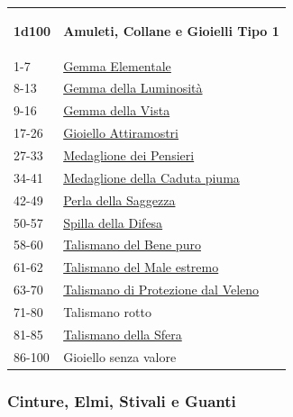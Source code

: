 \begin{multicols}{2}
{\medskip

{\small\begin{tabularx}{0.45\textwidth}{lX}\hypertarget{amuleticollanegioielli2}{}
\textbf{1d100} & \textbf{Amuleti, Collane e Gioielli Tipo 1}\\
1-7 & \hyperlink{GemmaElementale}{Gemma Elementale}\\
8-13& \hyperlink{GemmadellaLuminosità}{Gemma della Luminosità}\\
9-16& \hyperlink{GemmadellaVista}{Gemma della Vista}\\
17-26& \hyperlink{GioielloAttiramostri}{Gioiello Attiramostri}\\
27-33& \hyperlink{MedaglionedeiPensieri}{Medaglione dei Pensieri}\\
34-41& \hyperlink{MedaglionedellaCadutapiuma}{Medaglione della Caduta piuma}\\
42-49& \hyperlink{PerladellaSaggezza}{Perla della Saggezza}\\
50-57& \hyperlink{SpilladellaDifesa}{Spilla della Difesa}\\
58-60& \hyperlink{TalismanodelBenepuro}{Talismano del Bene puro}\\
61-62& \hyperlink{TalismanodelMaleestremo}{Talismano del Male estremo}\\
63-70& \hyperlink{Talismano di Protezione dal Veleno}{Talismano di Protezione dal Veleno}\\
71-80 & Talismano rotto\\
81-85& \hyperlink{TalismanodellaSfera}{Talismano della Sfera}\\
86-100& Gioiello senza valore
\end{tabularx}}



\subsubsection{Cinture, Elmi, Stivali e Guanti}\hypertarget{cintureelmi}{}\label{cintureelmi}

}
\end{multicols}
